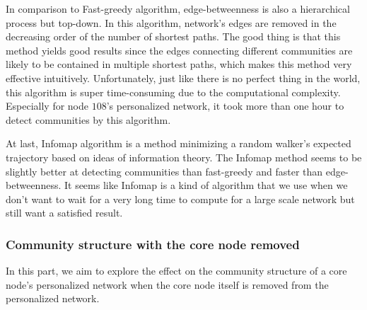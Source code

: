 \documentclass[11pt]{article}
\begin{document}
In comparison to Fast-greedy algorithm, edge-betweenness is also a hierarchical process but top-down. In this algorithm, network's edges are removed in the decreasing order of the number of shortest paths. The good thing is that this method yields good results since the edges connecting different communities are likely to be contained in multiple shortest paths, which makes this method very effective intuitively. Unfortunately, just like there is no perfect thing in the world, this algorithm is super time-consuming due to the computational complexity. Especially for node $108$'s personalized network, it took more than one hour to detect communities by this algorithm.

At last, Infomap algorithm is a method minimizing a random walker’s expected trajectory based on ideas of information theory. The Infomap method seems to be slightly better at detecting communities than fast-greedy and faster than edge-betweenness. It seems like Infomap is a kind of algorithm that we use when we don't want to wait for a very long time to compute for a large scale network but still want a satisfied result.

\subsubsection{Community structure with the core node removed}

In this part, we aim to explore the effect on the community structure of a core node’s personalized network when the core node itself is removed from the personalized network.
\end{document}
